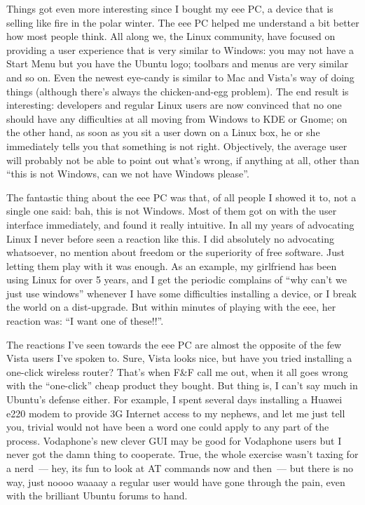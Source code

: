 \documentclass{book}
\begin{document}
Things got even more interesting since I bought my eee PC, a device
that is selling like fire in the polar winter. The eee PC helped me
understand a bit better how most people think. All along we, the Linux
community, have focused on providing a user experience that is very
similar to Windows: you may not have a Start Menu but you have the
Ubuntu logo; toolbars and menus are very similar and so on. Even the
newest eye-candy is similar to Mac and Vista's way of doing things
(although there's always the chicken-and-egg problem). The end result
is interesting: developers and regular Linux users are now convinced
that no one should have any difficulties at all moving from Windows to
KDE or Gnome; on the other hand, as soon as you sit a user down on a
Linux box, he or she immediately tells you that something is not
right. Objectively, the average user will probably not be able to
point out what's wrong, if anything at all, other than ``this is not
Windows, can we not have Windows please''.

The fantastic thing about the eee PC was that, of all people I showed
it to, not a single one said: bah, this is not Windows. Most of them
got on with the user interface immediately, and found it really
intuitive. In all my years of advocating Linux I never before seen a
reaction like this. I did absolutely no advocating whatsoever, no
mention about freedom or the superiority of free software. Just
letting them play with it was enough. As an example, my girlfriend has
been using Linux for over 5 years, and I get the periodic complains of
``why can't we just use windows'' whenever I have some difficulties
installing a device, or I break the world on a dist-upgrade. But
within minutes of playing with the eee, her reaction was: ``I want one
of these!!''.

The reactions I've seen towards the eee PC are almost the opposite of
the few Vista users I've spoken to. Sure, Vista looks nice, but have
you tried installing a one-click wireless router? That's when F\&F call
me out, when it all goes wrong with the ``one-click'' cheap product they
bought. But thing is, I can't say much in Ubuntu's defense either. For
example, I spent several days installing a Huawei e220 modem to
provide 3G Internet access to my nephews, and let me just tell you,
trivial would not have been a word one could apply to any part of the
process. Vodaphone's new clever GUI may be good for Vodaphone users
but I never got the damn thing to cooperate. True, the whole exercise
wasn't taxing for a nerd~--- hey, its fun to look at AT commands now and
then~--- but there is no way, just noooo waaaay a regular user would
have gone through the pain, even with the brilliant Ubuntu forums to
hand.
\end{document}
